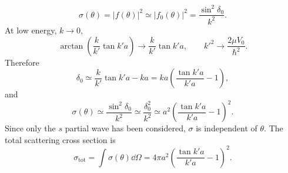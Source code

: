 \begin{equation}
\sigma(\theta)=|f(\theta)|^2\simeq |f_0(\theta)|^2
=\frac{\sin^2\delta_0}{k^2}.
\end{equation}
At low energy, $k\to0$,
\begin{equation}
\arctan\left(\frac{k}{k'}\tan k'a\right)
\longrightarrow \frac{k}{k'}\tan k'a,
\qquad k'^2\longrightarrow\frac{2\mu V_0}{\hbar^2}.
\end{equation}
Therefore
\begin{equation}
\delta_0\simeq\frac{k}{k'}\tan k'a-ka
=ka\left(\frac{\tan k'a}{k'a}-1\right),
\end{equation}
and
\begin{equation}
\boxed{\sigma(\theta)\simeq\frac{\sin^2\delta_0}{k^2}
\simeq\frac{\delta_0^2}{k^2}
\simeq a^2\left(\frac{\tan k'a}{k'a}-1\right)^2}.
\end{equation}
Since only the $s$ partial wave has been considered, $\sigma$ is independent of $\theta$. The total scattering cross section is
\begin{equation}
\boxed{\sigma_{\mathrm{tot}}=\int\sigma(\theta)\dd\Omega
=4\pi a^2\left(\frac{\tan k'a}{k'a}-1\right)^2}.
\end{equation}

